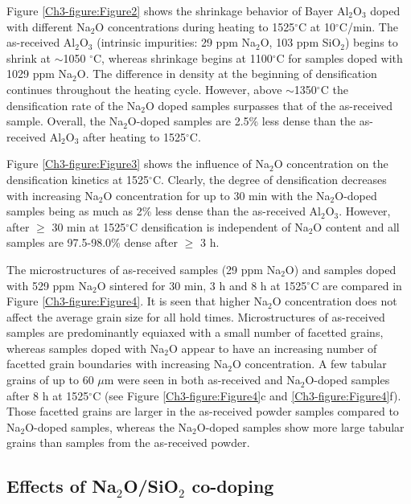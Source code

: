 Figure \ref{Ch3-figure:Figure2} shows the shrinkage behavior of Bayer Al$_{2}$O$_{3}$ doped with different Na$_{2}$O concentrations during heating to 1525$^{\circ}$C at 10$^{\circ}$C/min. The as-received Al$_{2}$O$_{3}$ (intrinsic impurities: 29 ppm Na$_{2}$O, 103 ppm SiO$_{2}$) begins to shrink at $\sim$1050 $^{\circ}$C, whereas shrinkage begins at 1100$^{\circ}$C for samples doped with 1029 ppm Na$_{2}$O. The difference in density at the beginning of densification continues throughout the heating cycle. However, above $\sim$1350$^{\circ}$C the densification rate of the Na$_{2}$O doped samples surpasses that of the as-received sample. Overall, the Na$_{2}$O-doped samples are 2.5\% less dense than the as-received Al$_{2}$O$_{3}$ after heating to 1525$^{\circ}$C.

Figure \ref{Ch3-figure:Figure3} shows the influence of Na$_{2}$O concentration on the densification kinetics at 1525$^{\circ}$C. Clearly, the degree of densification decreases with increasing Na$_{2}$O concentration for up to 30 min with the Na$_{2}$O-doped samples being as much as 2\% less dense than the as-received Al$_{2}$O$_{3}$. However, after $\geq$ 30 min at 1525$^{\circ}$C densification is independent of Na$_{2}$O content and all samples are 97.5-98.0\% dense after $\geq$ 3 h. 

The microstructures of as-received samples (29 ppm Na$_{2}$O) and samples doped with 529 ppm Na$_{2}$O sintered for 30 min, 3 h and 8 h at 1525$^{\circ}$C are compared in Figure \ref{Ch3-figure:Figure4}. It is seen that higher Na$_{2}$O concentration does not affect the average grain size for all hold times. Microstructures of as-received samples are predominantly equiaxed with a small number of facetted grains, whereas samples doped with Na$_{2}$O appear to have an increasing number of facetted grain boundaries with increasing Na$_{2}$O concentration. A few tabular grains of up to 60 $\mu$m were seen in both as-received and Na$_{2}$O-doped samples after 8 h at 1525$^{\circ}$C (see Figure \ref{Ch3-figure:Figure4}c and \ref{Ch3-figure:Figure4}f). Those facetted grains are larger in the as-received powder samples compared to Na$_{2}$O-doped samples, whereas the Na$_{2}$O-doped samples show more large tabular grains than samples from the as-received powder.

\subsection{Effects of Na$_{2}$O/SiO$_{2}$ co-doping}

